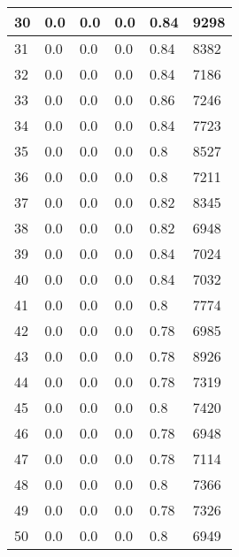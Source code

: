 \begin{longtable}{|l|l|l|l|l|l|}
30 & 0.0 & 0.0 & 0.0 & 0.84 & 9298 \\ \hline 
31 & 0.0 & 0.0 & 0.0 & 0.84 & 8382 \\ \hline 
32 & 0.0 & 0.0 & 0.0 & 0.84 & 7186 \\ \hline 
33 & 0.0 & 0.0 & 0.0 & 0.86 & 7246 \\ \hline 
34 & 0.0 & 0.0 & 0.0 & 0.84 & 7723 \\ \hline 
35 & 0.0 & 0.0 & 0.0 & 0.8 & 8527 \\ \hline 
36 & 0.0 & 0.0 & 0.0 & 0.8 & 7211 \\ \hline 
37 & 0.0 & 0.0 & 0.0 & 0.82 & 8345 \\ \hline 
38 & 0.0 & 0.0 & 0.0 & 0.82 & 6948 \\ \hline 
39 & 0.0 & 0.0 & 0.0 & 0.84 & 7024 \\ \hline 
40 & 0.0 & 0.0 & 0.0 & 0.84 & 7032 \\ \hline 
41 & 0.0 & 0.0 & 0.0 & 0.8 & 7774 \\ \hline 
42 & 0.0 & 0.0 & 0.0 & 0.78 & 6985 \\ \hline 
43 & 0.0 & 0.0 & 0.0 & 0.78 & 8926 \\ \hline 
44 & 0.0 & 0.0 & 0.0 & 0.78 & 7319 \\ \hline 
45 & 0.0 & 0.0 & 0.0 & 0.8 & 7420 \\ \hline 
46 & 0.0 & 0.0 & 0.0 & 0.78 & 6948 \\ \hline 
47 & 0.0 & 0.0 & 0.0 & 0.78 & 7114 \\ \hline 
48 & 0.0 & 0.0 & 0.0 & 0.8 & 7366 \\ \hline 
49 & 0.0 & 0.0 & 0.0 & 0.78 & 7326 \\ \hline 
50 & 0.0 & 0.0 & 0.0 & 0.8 & 6949 \\ \hline 
\end{longtable}